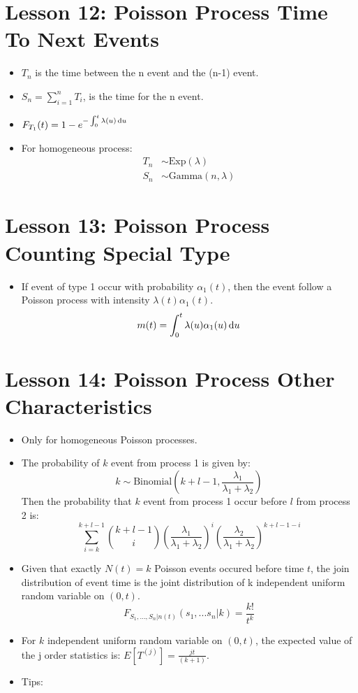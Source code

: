 \documentclass[10pt, french]{article}
\begin{document}
\begin{multicols*}{3}
\section*{Lesson 12: Poisson Process Time To Next Events}
\begin{itemize}[align=left,leftmargin=*]
    \item $T_n$ is the time between the n event and the (n-1) event.
    \item $S_n = \sum_{i=1}^n T_i$, is the time for the n event.
    \item $F_{T_1}(t)=1-e^{-\int_0^t \lambda(u) \mathop{}\!\mathrm{d}{u}}$
    \item For homogeneous process: 
    \begin{align*}
        T_n &\sim \mathrm{Exp}(\lambda) \\
        S_n &\sim \mathrm{Gamma}(n, \lambda)
    \end{align*}
\end{itemize}

\section*{Lesson 13: Poisson Process Counting Special Type}
\begin{itemize}[align=left,leftmargin=*]
    \item If event of type 1 occur with probability $\alpha_1(t)$, then the event follow a Poisson process with intensity $\lambda(t) \alpha_1(t)$. \[ m(t)=\int_0^t \lambda(u)\alpha_1(u) \mathop{}\!\mathrm{d}{u} \]
\end{itemize}

\section*{Lesson 14: Poisson Process Other Characteristics}
\begin{itemize}[align=left,leftmargin=*]
    \item Only for homogeneous Poisson processes.
    \item The probability of $k$ event from process 1 is given by: \[ k \sim \mathrm{Binomial}(k+l-1, \frac{\lambda_1}{\lambda_1 + \lambda_2}) \] Then the probability that $k$ event from process 1 occur before $l$ from process 2 is: \[ \sum_{i=k}^{k+l-1} \binom{k+l-1}{i} \left( \frac{\lambda_1}{\lambda_1+\lambda_2} \right)^i \left(\frac{\lambda_2}{\lambda_1+\lambda_2}\right)^{k+l-1-i} \]
    \item Given that exactly $N(t) = k$ Poisson events occured before time $t$, the join distribution of event time is the joint distribution of k independent uniform random variable on $(0, t)$. \[ F_{S_1,...,S_n|n(t)}(s_1,...s_n|k) = \frac{k!}{t^k} \]
    \item For $k$ independent uniform random variable on $(0, t)$, the expected value of the j order statistics is: $E[T^{(j)}] =  \frac{jt}{(k+1)} $. 
    \item Tips: {\color{AppendixColor}}
\end{itemize}


\end{multicols*}
\end{document}
